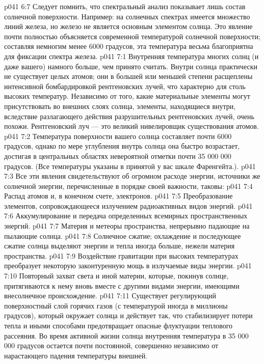 \vs p041 6:7 \pc Следует помнить, что спектральный анализ показывает лишь состав солнечной поверхности. Например: на солнечных спектрах имеется множество линий железа, но железо не является основным элементом солнца. Это явление почти полностью объясняется современной температурой солнечной поверхности; составляя немногим менее 6000 градусов, эта температура весьма благоприятна для фиксации спектра железа.
\vs p041 7:1 Внутренняя температура многих солнц (и даже вашего) намного больше, чем принято считать. Внутри солнца практически не существует целых атомов; они в большей или меньшей степени расщеплены интенсивной бомбардировкой рентгеновских лучей, что характерно для столь высоких температур. Независимо от того, какие материальные элементы могут присутствовать во внешних слоях солнца, элементы, находящиеся внутри, вследствие разлагающего действия разрушительных рентгеновских лучей, очень похожи. Рентгеновский луч --- это великий нивелировщик существования атомов.
\vs p041 7:2 Температура поверхности вашего солнца составляет почти 6000 градусов, однако по мере углубления внутрь солнца она быстро возрастает, достигая в центральных областях невероятной отметки почти 35 000 000 градусов. (Все температуры указаны в принятой у вас шкале Фаренгейта.).
\vs p041 7:3 \pc Все эти явления свидетельствуют об огромном расходе энергии, источники же солнечной энергии, перечисленные в порядке своей важности, таковы:
\vs p041 7:4 \bibnobreakspace Распад атомов и, в конечном счете, электронов.
\vs p041 7:5 \bibnobreakspace Преобразование элементов, сопровождающееся излучением радиоактивных видов энергий.
\vs p041 7:6 \bibnobreakspace Аккумулирование и передача определенных всемирных пространственных энергий.
\vs p041 7:7 \bibnobreakspace Материя и метеоры пространства, непрерывно падающие на пылающие солнца.
\vs p041 7:8 \bibnobreakspace Солнечное сжатие; охлаждение и последующее сжатие солнца выделяют энергии и тепла иногда больше, нежели материя пространства.
\vs p041 7:9 \bibnobreakspace Воздействие гравитации при высоких температурах преобразует некоторую законтуренную мощь в излучаемые виды энергии.
\vs p041 7:10 \bibnobreakspace Повторный захват света и иной материи, которые, покинув солнце, притягиваются к нему вновь вместе с другими видами энергии, имеющими внесолнечное происхождение.
\vs p041 7:11 \pc Существует регулирующий поверхностный слой горячих газов (с температурой иногда в миллионы градусов), который окружает солнца и действует так, что стабилизирует потери тепла и иными способами предотвращает опасные флуктуации теплового рассеяния. Во время активной жизни солнца внутренняя температура в 35 000 000 градусов остается почти постоянной, совершенно независимо от нарастающего падения температуры внешней.

